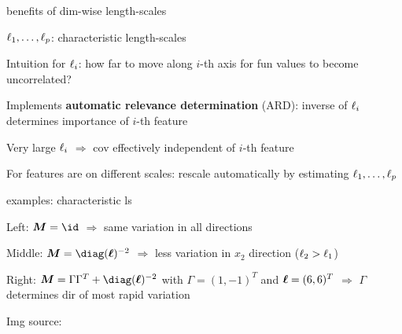 \documentclass[11pt,compress,t,notes=noshow, xcolor=table]{beamer}
\begin{document}
\begin{framei}[sep=L]{benefits of dim-wise length-scales}
\item $\ell_1,\dots, \ell_p$: characteristic length-scales
\item Intuition for $\ell_i$: how far to move along $i$-th axis for fun values to become uncorrelated?
\item Implements \textbf{automatic relevance determination} (ARD): inverse of $\ell_i$ determines importance of $i$-th feature
\item Very large $\ell_i$ $\Rightarrow$ cov effectively independent of $i$-th feature
\item For features are on different scales: rescale automatically by estimating $\ell_1,\dots, \ell_p$ 
\end{framei}

\begin{framei}{examples: characteristic ls}
\item Left: $\bm{M} = \id$ $\Rightarrow$ same variation in all directions
\item Middle: $\bm{M} = \diag(\bm{\ls})^{-2}$ $\Rightarrow$ less variation in $x_2$ direction ($\ell_2 > \ell_1$)
\item Right: $\bm{M} = \Gamma \Gamma^T + \diag(\bm{\ls})^{-2}$ with $\Gamma = (1, -1)^T$ and $\bm{\ell} = (6, 6)^T$ $\Rightarrow$ $\Gamma$ determines dir of most rapid variation
\vfill
{}
\item Img source: 
\end{framei}





\end{document}
